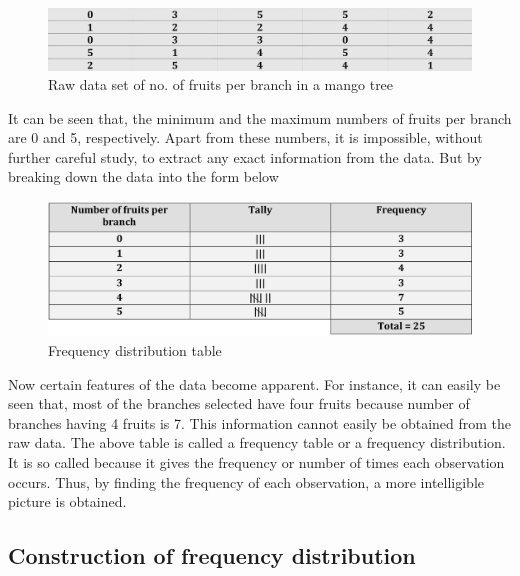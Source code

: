 \documentclass[
]{book}
\begin{document}
\begin{figure}

{\centering \includegraphics[width=1\linewidth]{images/freq1} 

}

\caption{Raw data set of no. of fruits per branch in a mango tree}\label{fig:freq1}
\end{figure}

It can be seen that, the minimum and the maximum numbers of fruits per branch are 0 and 5, respectively. Apart from these numbers, it is impossible, without further careful study, to extract any exact information from the data. But by breaking down the data into the form below

\begin{figure}

{\centering \includegraphics[width=1\linewidth]{images/fig1.4} 

}

\caption{Frequency distribution table}\label{fig:fig}
\end{figure}

Now certain features of the data become apparent. For instance, it can easily be seen that, most of the branches selected have four fruits because number of branches having 4 fruits is 7. This information cannot easily be obtained from the raw data. The above table is called a frequency table or a frequency distribution. It is so called because it gives the frequency or number of times each observation occurs. Thus, by
finding the frequency of each observation, a more intelligible picture is obtained.

\subsection{Construction of frequency distribution}\label{construction-of-frequency-distribution}
\end{document}
